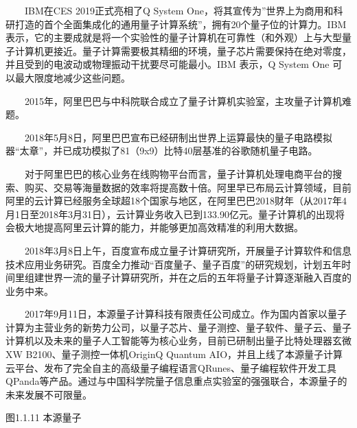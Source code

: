 \documentclass[a4paper,11pt,english]{sphinxmanual}
\begin{document}
\sphinxAtStartPar
{}

\sphinxAtStartPar
  IBM在CES 2019正式亮相了Q System One，将其宣传为”世界上为商用和科研打造的首个全面集成化的通用量子计算系统”，拥有20个量子位的计算力。IBM 表示，它的主要成就是将一个实验性的量子计算机在可靠性（和外观）上与大型量子计算机更接近。量子计算需要极其精细的环境，量子芯片需要保持在绝对零度，并且受到的电波动或物理振动干扰要尽可能最小。IBM 表示，Q System One 可以最大限度地减少这些问题。

\sphinxAtStartPar
{}

\sphinxAtStartPar
  2015年，阿里巴巴与中科院联合成立了量子计算机实验室，主攻量子计算机难题。

\sphinxAtStartPar
  2018年5月8日，阿里巴巴宣布已经研制出世界上运算最快的量子电路模拟器“太章”，并已成功模拟了81（9x9）比特40层基准的谷歌随机量子电路。

\sphinxAtStartPar
  对于阿里巴巴的核心业务在线购物平台而言，量子计算机处理电商平台的搜索、购买、交易等海量数据的效率将提高数十倍。阿里早已布局云计算领域，目前阿里的云计算已经服务全球超18个国家与地区，在阿里巴巴2018财年（从2017年4月1日至2018年3月31日），云计算业务收入已到133.90亿元。量子计算机的出现将会极大地提高阿里云计算的能力，并能够更加高效精准的利用大数据。

\sphinxAtStartPar
{}

\sphinxAtStartPar
  2018年3月8日上午，百度宣布成立量子计算研究所，开展量子计算软件和信息技术应用业务研究。百度全力推动“百度量子、量子百度”的研究规划，计划五年时间里组建世界一流的量子计算研究所，并在之后的五年将量子计算逐渐融入百度的业务中来。

\sphinxAtStartPar
{}

\sphinxAtStartPar
  2017年9月11日，本源量子计算科技有限责任公司成立。作为国内首家以量子计算为主营业务的新势力公司，以量子芯片、量子测控、量子软件、量子云、量子计算机以及未来的量子人工智能等为核心业务，目前已研制出量子比特处理器玄微XW B2\sphinxhyphen{}100、量子测控一体机OriginQ Quantum AIO，并且上线了本源量子计算云平台、发布了完全自主的高级量子编程语言QRunes、量子编程软件开发工具QPanda等产品。通过与中国科学院量子信息重点实验室的强强联合，本源量子的未来发展不可限量。


\begin{center}图1.1.11 本源量子
\end{center}
\sphinxstepscope
\end{document}
